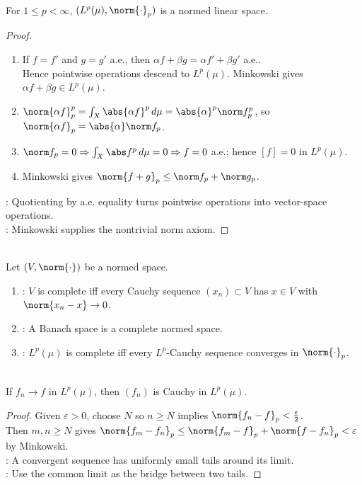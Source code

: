 \begin{theorem} \label{thm:lp-normed-linear-space} \\
For $1\leq p<\infty$, $(L^p(\mu),\norm{\cdot}_p)$ is a normed linear space.
\begin{proof}
\begin{enumerate}[label=(\roman*)]
\setlength{\itemsep}{0pt}
\item If $f=f'$ and $g=g'$ a.e., then $\alpha f+\beta g=\alpha f'+\beta g'$ a.e..\\
Hence pointwise operations descend to $L^p(\mu)$. Minkowski gives $\alpha f+\beta g\in L^p(\mu)$.
\item $\norm{\alpha f}_p^p=\int_X\abs{\alpha f}^p\,d\mu=\abs{\alpha}^p\norm f_p^p$, so $\norm{\alpha f}_p=\abs{\alpha}\norm f_p$.
\item $\norm f_p=0\Rightarrow\int_X\abs f^p\,d\mu=0\Rightarrow f=0$ a.e.; hence $[f]=0$ in $L^p(\mu)$.
\item Minkowski gives $\norm{f+g}_p\leq\norm f_p+\norm g_p$.
\end{enumerate}
: Quotienting by a.e. equality turns pointwise operations into vector-space operations.\\
: Minkowski supplies the nontrivial norm axiom.
\end{proof}
\end{theorem}

\begin{definition} \label{def:lp-cauchy-complete-language} \\
Let $(V,\norm{\cdot})$ be a normed space.
\begin{enumerate}[label=(\roman*)]
\setlength{\itemsep}{0pt}
\item {}: $V$ is complete iff every Cauchy sequence $(x_n)\subset V$ has $x\in V$ with $\norm{x_n-x}\to0$.
\item {}: A Banach space is a complete normed space.
\item {}: $L^p(\mu)$ is complete iff every $L^p$-Cauchy sequence converges in $\norm{\cdot}_p$.
\end{enumerate}
\end{definition}

\begin{lemma} \label{lem:lp-convergent-sequences-are-cauchy} \\
If $f_n\to f$ in $L^p(\mu)$, then $(f_n)$ is Cauchy in $L^p(\mu)$.
\begin{proof}
Given $\varepsilon>0$, choose $N$ so $n\geq N$ implies $\norm{f_n-f}_p<\frac{\varepsilon}{2}$.\\
Then $m,n\geq N$ gives $\norm{f_m-f_n}_p\leq\norm{f_m-f}_p+\norm{f-f_n}_p<\varepsilon$ by Minkowski.\\
: A convergent sequence has uniformly small tails around its limit.\\
: Use the common limit as the bridge between two tails.
\end{proof}
\end{lemma}

